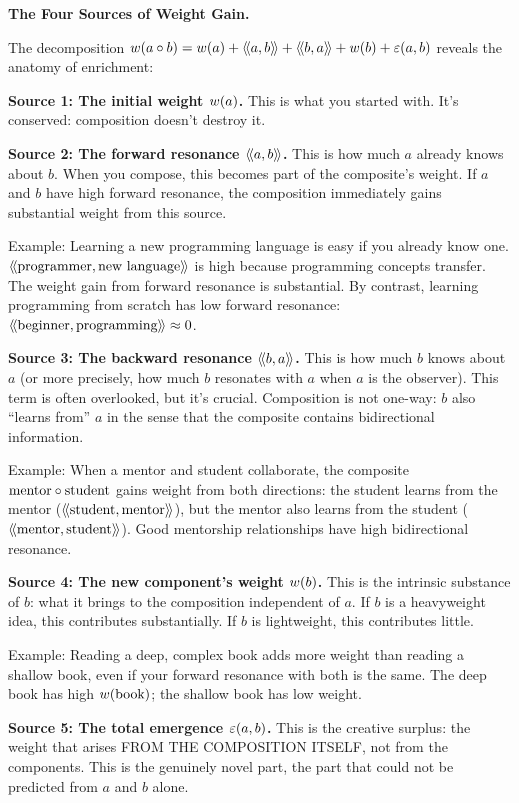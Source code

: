 \begin{interpretation}
\textbf{The Four Sources of Weight Gain.}

The decomposition $w(a \circ b) = w(a) + \langle\!\langle a, b \rangle\!\rangle + \langle\!\langle b, a \rangle\!\rangle + w(b) + \varepsilon(a,b)$
reveals the anatomy of enrichment:

\textbf{Source 1: The initial weight $w(a)$.} This is what you started with.
It's conserved: composition doesn't destroy it.

\textbf{Source 2: The forward resonance $\langle\!\langle a, b \rangle\!\rangle$.} This is how much $a$ already
knows about $b$. When you compose, this becomes part of the composite's weight.
If $a$ and $b$ have high forward resonance, the composition immediately gains
substantial weight from this source.

Example: Learning a new programming language is easy if you already know one.
$\langle\!\langle \text{programmer}, \text{new language} \rangle\!\rangle$ is high because programming concepts
transfer. The weight gain from forward resonance is substantial. By contrast,
learning programming from scratch has low forward resonance: $\langle\!\langle \text{beginner}, \text{programming} \rangle\!\rangle
\approx 0$.

\textbf{Source 3: The backward resonance $\langle\!\langle b, a \rangle\!\rangle$.} This is how much $b$
knows about $a$ (or more precisely, how much $b$ resonates with $a$ when $a$ is
the observer). This term is often overlooked, but it's crucial. Composition is
not one-way: $b$ also ``learns from'' $a$ in the sense that the composite
contains bidirectional information.

Example: When a mentor and student collaborate, the composite $\text{mentor} \circ \text{student}$
gains weight from both directions: the student learns from the mentor ($\langle\!\langle \text{student}, \text{mentor} \rangle\!\rangle$),
but the mentor also learns from the student ($\langle\!\langle \text{mentor}, \text{student} \rangle\!\rangle$).
Good mentorship relationships have high bidirectional resonance.

\textbf{Source 4: The new component's weight $w(b)$.} This is the intrinsic
substance of $b$: what it brings to the composition independent of $a$. If $b$
is a heavyweight idea, this contributes substantially. If $b$ is lightweight,
this contributes little.

Example: Reading a deep, complex book adds more weight than reading a shallow
book, even if your forward resonance with both is the same. The deep book has
high $w(\text{book})$; the shallow book has low weight.

\textbf{Source 5: The total emergence $\varepsilon(a,b)$.} This is the creative
surplus: the weight that arises FROM THE COMPOSITION ITSELF, not from the
components. This is the genuinely novel part, the part that could not be predicted
from $a$ and $b$ alone.


\end{interpretation}
